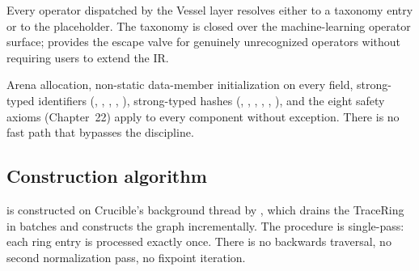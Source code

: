 \begin{property}
\label{prop:ir001-closure}
Every operator dispatched by the Vessel layer resolves either to a  taxonomy entry or to the  placeholder.
The taxonomy is closed over the machine-learning operator surface;  provides the escape valve for genuinely unrecognized operators without requiring users to extend the IR.
\end{property}

\begin{property}
\label{prop:ir001-substrate-compose}
Arena allocation, non-static data-member initialization on every field, strong-typed identifiers (, , , , ), strong-typed hashes (, , , , , ), and the eight safety axioms (Chapter~22) apply to every  component without exception.
There is no fast path that bypasses the discipline.
\end{property}

\subsection{Construction algorithm}
\label{sec:ir001-construction}

 is constructed on Crucible's background thread by , which drains the TraceRing in batches and constructs the graph incrementally.
The procedure is single-pass: each ring entry is processed exactly once.
There is no backwards traversal, no second normalization pass, no fixpoint iteration.

